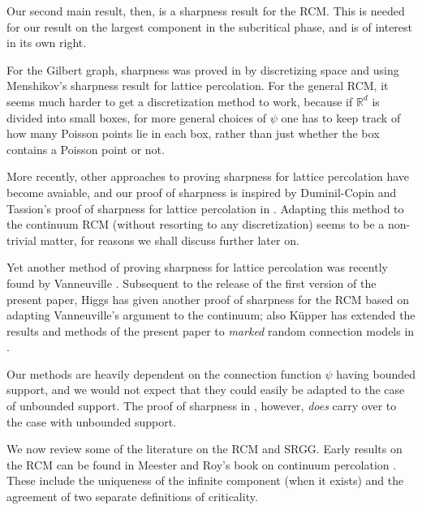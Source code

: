 \documentclass[a4paper,12pt]{scrartcl}
\theoremstyle{definition}
\theoremstyle{remark}
\begin{document}
Our second main result, then, is a sharpness result for the RCM.
This is needed for our result on the largest component in the subcritical phase,
and is of interest in its own right.

For the Gilbert graph, sharpness was proved in \cite{penrose2003random}
by discretizing space and using Menshikov's sharpness result
\cite{menshikov1986coincidence}
for lattice percolation.
For the general  RCM, it seems much harder to get  a discretization method to work, because if $\mathbb R^d$ is divided into small boxes, for more general choices of $\psi$ one has to keep track of how many Poisson points lie in each box, rather than just whether the box contains a Poisson point or not.

More recently, other approaches to proving sharpness for
lattice percolation have become avaiable, and
our proof of sharpness is inspired by Duminil-Copin and Tassion's
proof of sharpness for lattice percolation in
\cite{duminilcopin2015new}.
Adapting this method to the  continuum RCM (without resorting to any discretization) seems to be a non-trivial matter, for reasons we shall
discuss further later on.

Yet another method of proving sharpness for lattice percolation was recently  found by Vanneuville \cite{vanneuville}.
Subsequent to the release of the first version \cite{v1} of the present paper,
Higgs \cite{higgs}  has given another proof of sharpness for the RCM
based on adapting Vanneuville's argument to the continuum;
also K\"upper has extended
the results and methods of the present paper
to {\em marked} random connection models in \cite{kupper2025}.

Our methods are heavily dependent on the connection function $\psi$ having
bounded support, and we would not expect that they
could easily be adapted to the case of unbounded support.
The proof of sharpness in \cite{higgs}, however,
{\em does} carry over to the case with unbounded support.


We now review some of the literature on the RCM and SRGG.
Early  results on the RCM can be found in Meester and Roy's book
on continuum percolation \cite{meester1996continuum}. These include the uniqueness of the infinite component (when it exists) and the agreement of two separate definitions of criticality.
\end{document}

